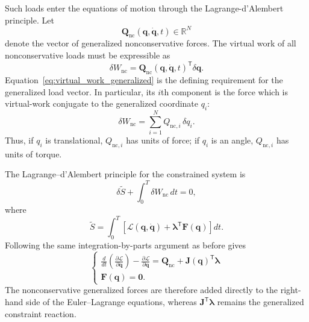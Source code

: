 \documentclass{article}
\begin{document}
Such loads enter the equations of motion through the
Lagrange-d'Alembert principle. Let
\[
\bm Q_{\mathrm{nc}}(\bm q,\dot{\bm q},t)
\in \mathbb R^N
\]
denote the vector of generalized nonconservative forces. The virtual work of
all nonconservative loads must be expressible as
\begin{equation}
\boxed{
\delta W_{\mathrm{nc}}
=
\bm Q_{\mathrm{nc}}(\bm q,\dot{\bm q},t)^{\mathsf T}
\delta\bm q.
}
\label{eq:virtual_work_generalized}
\end{equation}
Equation~\eqref{eq:virtual_work_generalized} is the defining requirement for
the generalized load vector. In particular, its $i$th component is the force
which is virtual-work conjugate to the generalized coordinate $q_i$:
\[
\delta W_{\mathrm{nc}}
=
\sum_{i=1}^{N}
Q_{\mathrm{nc},i}\,\delta q_i.
\]
Thus, if $q_i$ is translational, $Q_{\mathrm{nc},i}$ has units of force; if
$q_i$ is an angle, $Q_{\mathrm{nc},i}$ has units of torque.

The Lagrange--d'Alembert principle for the constrained system is
\begin{equation}
\delta \widetilde S
+
\int_0^T
\delta W_{\mathrm{nc}}\,dt
=
0,
\end{equation}
where
\[
\widetilde S
=
\int_0^T
\left[
\mathcal L(\bm q,\dot{\bm q})
+
\bm\lambda^{\mathsf T}\bm F(\bm q)
\right]dt.
\]
Following the same integration-by-parts argument as before gives
\begin{equation}
\boxed{
\left\{
\begin{array}{l}
\displaystyle
\frac{d}{dt}
\left(
\frac{\partial\mathcal L}{\partial\dot{\bm q}}
\right)
-
\frac{\partial\mathcal L}{\partial\bm q}
=
\bm Q_{\mathrm{nc}}
+
\bm J(\bm q)^{\mathsf T}\bm\lambda
\\[1.2em]
\bm F(\bm q)=\bm 0.
\end{array}
\right.
}
\label{eq:constrained_lagrange_dalembert}
\end{equation}
The nonconservative generalized forces are therefore added directly to the
right-hand side of the Euler--Lagrange equations, whereas
$\bm J^{\mathsf T}\bm\lambda$ remains the generalized constraint reaction.
\end{document}

